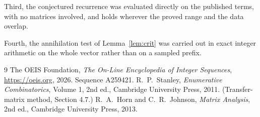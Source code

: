 \documentclass[11pt,a4paper]{article}
\theoremstyle{plain}
\theoremstyle{definition}
\begin{document}
Third, the conjectured recurrence was evaluated directly on the published terms, with no
matrices involved, and holds wherever the proved range and the data overlap.

Fourth, the annihilation test of Lemma~\ref{lem:crit} was carried out in exact integer
arithmetic on the whole vector rather than on a sampled prefix.

\begin{thebibliography}{9}
 The OEIS Foundation, \emph{The On-Line Encyclopedia of Integer
Sequences}, \url{https://oeis.org}, 2026. Sequence A259421.
 R.~P.~Stanley, \emph{Enumerative Combinatorics}, Volume 1, 2nd ed.,
Cambridge University Press, 2011. (Transfer-matrix method, Section 4.7.)
 R.~A.~Horn and C.~R.~Johnson, \emph{Matrix Analysis}, 2nd ed., Cambridge
University Press, 2013.
\end{thebibliography}
\end{document}
